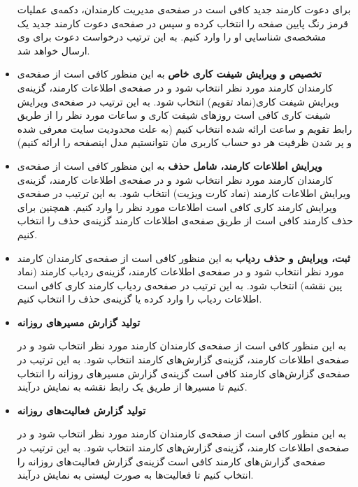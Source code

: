 \begin{itemize}
برای دعوت کارمند جدید کافی است در صفحه‌ی مدیریت کارمندان، دکمه‌ی عملیات قرمز رنگ پایین صفحه را انتخاب کرده و سپس در صفحه‌ی دعوت کارمند جدید یک مشخصه‌ی شناسایی او را وارد کنیم.
به این ترتیب درخواست دعوت برای وی ارسال خواهد شد.
\item \textbf{تخصیص و ویرایش شیفت کاری خاص} \newline
به این منظور کافی است از صفحه‌ی کارمندان کارمند مورد نظر انتخاب شود و در صفحه‌ی اطلاعات کارمند، گزینه‌ی  ویرایش شیفت کاری‌(نماد تقویم) انتخاب شود. به این ترتیب در صفحه‌ی ویرایش شیفت کاری کافی است روز‌های شیفت کاری و ساعات مورد نظر را از طریق رابط تقویم و ساعت ارائه شده انتخاب کنیم (به علت محدودیت سایت معرفی شده و پر شدن ظرفیت هر دو حساب کاربری مان نتوانستیم مدل اینصفحه را ارائه کنیم)
\item \textbf{ویرایش اطلاعات کارمند، شامل حذف} \newline
به این منظور کافی است از صفحه‌ی کارمندان کارمند مورد نظر انتخاب شود و در صفحه‌ی اطلاعات کارمند، گزینه‌ی  ویرایش اطلاعات کارمند (نماد کارت ویزیت) انتخاب شود. به این ترتیب در صفحه‌ی ویرایش کارمند کاری کافی است اطلاعات مورد نظر را وارد کنیم. همچنین برای حذف کارمند کافی است از طریق صفحه‌ی اطلاعات کارمند گزینه‌ی حذف را انتخاب کنیم.
\item \textbf{ثبت، ویرایش و حذف ردیاب} \newline
به این منظور کافی است از صفحه‌ی کارمندان کارمند مورد نظر انتخاب شود و در صفحه‌ی اطلاعات کارمند، گزینه‌ی  ردیاب کارمند (نماد پین نقشه) انتخاب شود. به این ترتیب در صفحه‌ی ردیاب کارمند کاری کافی است اطلاعات ردیاب را وارد کرده یا گزینه‌ی حذف را انتخاب کنیم.

\item \textbf{تولید گزارش مسیر‌های روزانه} \newline

به این منظور کافی است از صفحه‌ی کارمندان کارمند مورد نظر انتخاب شود و در صفحه‌ی اطلاعات کارمند، گزینه‌ی  گزارش‌های کارمند انتخاب شود. به این ترتیب در صفحه‌ی گزارش‌های کارمند کافی است گزینه‌ی گزارش مسیر‌های روزانه را انتخاب کنیم تا مسیر‌ها از طریق یک رابط نقشه به نمایش در‌آیند.

\item \textbf{تولید گزارش فعالیت‌های روزانه} \newline

به این منظور کافی است از صفحه‌ی کارمندان کارمند مورد نظر انتخاب شود و در صفحه‌ی اطلاعات کارمند، گزینه‌ی  گزارش‌های کارمند انتخاب شود. به این ترتیب در صفحه‌ی گزارش‌های کارمند کافی است گزینه‌ی گزارش فعالیت‌های روزانه را انتخاب کنیم تا فعالیت‌ها به صورت لیستی به نمایش در‌آیند.


\end{itemize}
